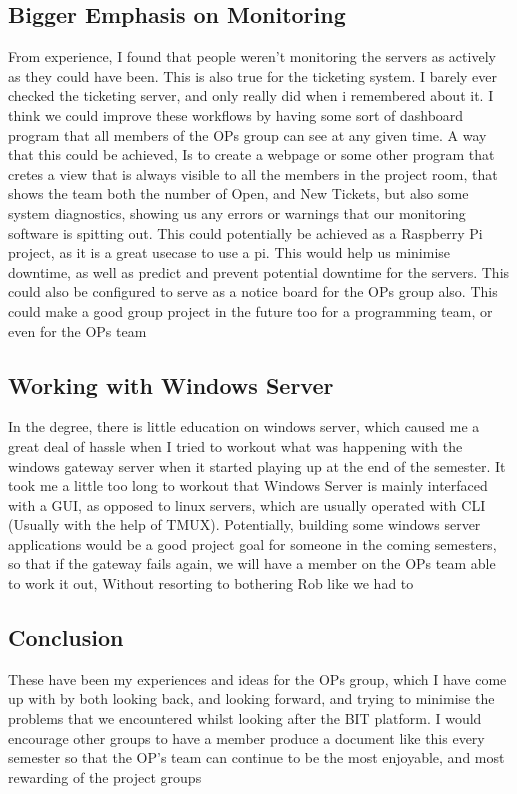\documentclass{article}
\begin{document}
\subsection{Bigger Emphasis on Monitoring}
From experience, I found that people weren't monitoring the servers as actively as they could have been. This is also true for the ticketing system. I barely ever
checked the ticketing server, and only really did when i remembered about it. I think we could improve these workflows by having some sort of dashboard program that
all members of the OPs group can see at any given time. A way that this could be achieved, Is to create a webpage or some other program that cretes a view that is 
always visible to all the members in the project room, that shows the team both the number of Open, and New Tickets, but also some system diagnostics, showing us
any errors or warnings that our monitoring software is spitting out. This could potentially be achieved as a Raspberry Pi project, as it is a great usecase to use a 
pi. This would help us minimise downtime, as well as predict and prevent potential downtime for the servers. This could also be configured to serve as a notice
board for the OPs group also. This could make a good group project in the future too for a programming team, or even for the OPs team


\subsection{Working with Windows Server}
In the degree, there is little education on windows server, which caused me a great deal of hassle when I tried to workout what was happening with the windows
gateway server when it started playing up at the end of the semester. It took me a little too long to workout that Windows Server is mainly interfaced with a 
GUI, as opposed to linux servers, which are usually operated with CLI (Usually with the help of TMUX). Potentially, building some windows server applications
would be a good project goal for someone in the coming semesters, so that if the gateway fails again, we will have a member on the OPs team able to work it
out, Without resorting to bothering Rob like we had to


\subsection*{Conclusion}
These have been my experiences and ideas for the OPs group, which I have come up with by both looking back, and looking forward, and trying to minimise
the problems that we encountered whilst looking after the BIT platform. I would encourage other groups to have a member produce a document like this every
semester so that the OP's team can continue to be the most enjoyable, and most rewarding of the project groups
\end{document}
